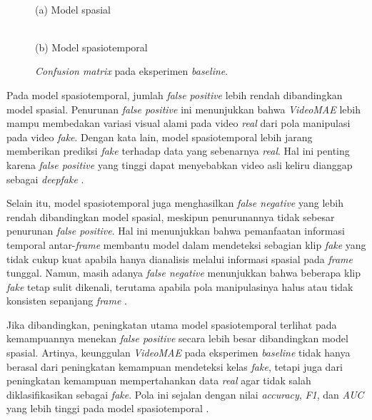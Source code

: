 \begin{figure}[htbp]
	\centering
	\begin{minipage}{0.48\textwidth}
		\centering
		\\(a) Model spasial
	\end{minipage}
	\hfill
	\begin{minipage}{0.48\textwidth}
		\centering
		\\(b) Model spasiotemporal
	\end{minipage}
	\caption{\textit{Confusion matrix} pada eksperimen \textit{baseline}.}
	\label{fig:4.baseline-cm}
\end{figure}

Pada model spasiotemporal, jumlah \textit{false positive} lebih rendah dibandingkan model spasial. Penurunan \textit{false positive} ini menunjukkan bahwa \textit{VideoMAE} lebih mampu membedakan variasi visual alami pada video \textit{real} dari pola manipulasi pada video \textit{fake}. Dengan kata lain, model spasiotemporal lebih jarang memberikan prediksi \textit{fake} terhadap data yang sebenarnya \textit{real}. Hal ini penting karena \textit{false positive} yang tinggi dapat menyebabkan video asli keliru dianggap sebagai \textit{deepfake} \cite{Gu2021}\cite{Haliassos2021}.

Selain itu, model spasiotemporal juga menghasilkan \textit{false negative} yang lebih rendah dibandingkan model spasial, meskipun penurunannya tidak sebesar penurunan \textit{false positive}. Hal ini menunjukkan bahwa pemanfaatan informasi temporal antar-\textit{frame} membantu model dalam mendeteksi sebagian klip \textit{fake} yang tidak cukup kuat apabila hanya dianalisis melalui informasi spasial pada \textit{frame} tunggal. Namun, masih adanya \textit{false negative} menunjukkan bahwa beberapa klip \textit{fake} tetap sulit dikenali, terutama apabila pola manipulasinya halus atau tidak konsisten sepanjang \textit{frame} \cite{Gu2021}\cite{tong2022videomaemaskedautoencodersdataefficient}.

Jika dibandingkan, peningkatan utama model spasiotemporal terlihat pada kemampuannya menekan \textit{false positive} secara lebih besar dibandingkan model spasial. Artinya, keunggulan \textit{VideoMAE} pada eksperimen \textit{baseline} tidak hanya berasal dari peningkatan kemampuan mendeteksi kelas \textit{fake}, tetapi juga dari peningkatan kemampuan mempertahankan data \textit{real} agar tidak salah diklasifikasikan sebagai \textit{fake}. Pola ini sejalan dengan nilai \textit{accuracy}, \textit{F1}, dan \textit{AUC} yang lebih tinggi pada model spasiotemporal \cite{Gu2021}\cite{KINGRA2024301817}\cite{tong2022videomaemaskedautoencodersdataefficient}.


